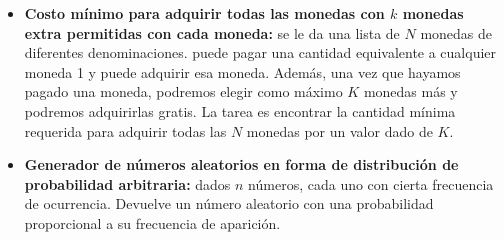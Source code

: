 \begin{itemize}
	\item  \textbf{Costo mínimo para adquirir todas las monedas con $k$ monedas extra permitidas con cada moneda:} se le da una lista de $N$ monedas de diferentes denominaciones. puede pagar una cantidad equivalente a cualquier moneda 1 y puede adquirir esa moneda. Además, una vez que hayamos pagado una moneda, podremos elegir como máximo $K$ monedas más y podremos adquirirlas gratis. La tarea es encontrar la cantidad mínima requerida para adquirir todas las $N$ monedas por un valor dado de $K$.
	\item \textbf{Generador de números aleatorios en forma de distribución de probabilidad arbitraria:} dados $n$ números, cada uno con cierta frecuencia de ocurrencia. Devuelve un número aleatorio con una probabilidad proporcional a su frecuencia de aparición.
\end{itemize}